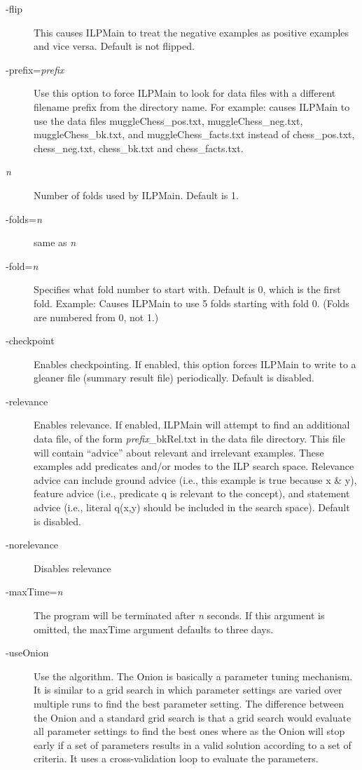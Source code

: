 \documentclass{article}
\begin{document}
\begin{description}
\item[-flip] This causes ILPMain to treat the negative examples as positive examples and vice versa.  Default is not flipped.
\item[-prefix=\emph{prefix}] Use this option to force ILPMain to look for data files with a different filename prefix from the directory name.  For example:
causes ILPMain to use the data files muggleChess\_pos.txt, muggleChess\_neg.txt, muggleChess\_bk.txt, and muggleChess\_facts.txt instead of chess\_pos.txt, chess\_neg.txt, chess\_bk.txt and chess\_facts.txt.
\item[\emph{n}] Number of folds used by ILPMain.  Default is 1.
\item[-folds=\emph{n}] same as 
\emph{n}
\item[-fold=\emph{n}] Specifies what fold number to start with.  Default is 0, which is the first fold.
Example: 
Causes ILPMain to use 5 folds starting with fold 0.  (Folds are numbered from 0, not 1.)
\item[-checkpoint] Enables checkpointing.  If enabled, this option forces ILPMain to write to a gleaner file (summary result file) periodically.   Default is disabled.
\item[-relevance]  Enables relevance.  If enabled, ILPMain will attempt to find an additional data file, of the form \emph{prefix}\_bkRel.txt in the data file directory.  This file will contain ``advice'' about relevant and irrelevant examples.  These examples add predicates and/or modes to the ILP search space.  Relevance advice can include ground advice (i.e., this example is true because x & y), feature advice (i.e., predicate q is relevant to the concept), and statement advice (i.e., literal q(x,y) should be included in the search space). Default is disabled.
\item[-norelevance] Disables relevance
\item[-maxTime=\emph{n}] The program will be terminated after \emph{n} seconds.  If this argument is omitted, the maxTime argument defaults to three days.
\item[-useOnion] Use the \onion algorithm. The Onion is basically a parameter tuning mechanism.  It is similar to a grid search in which parameter settings are varied over multiple runs to find the best parameter setting.  The difference between the Onion and a standard grid search is that a grid search would evaluate all parameter settings to find the best ones where as the Onion will stop early if a set of parameters results in a valid solution according to a set of criteria.  It uses a cross-validation loop to evaluate the parameters. 


\end{description}
\end{document}
